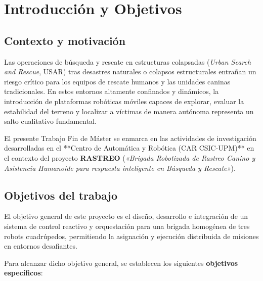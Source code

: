 \chapter{Introducción y Objetivos}
\label{chap:introduccion}

\section{Contexto y motivación}
\label{sec:contexto}

Las operaciones de búsqueda y rescate en estructuras colapsadas (\textit{Urban Search and Rescue}, USAR) tras desastres naturales o colapsos estructurales entrañan un riesgo crítico para los equipos de rescate humanos y las unidades caninas tradicionales. En estos entornos altamente confinados y dinámicos, la introducción de plataformas robóticas móviles capaces de explorar, evaluar la estabilidad del terreno y localizar a víctimas de manera autónoma representa un salto cualitativo fundamental.

El presente Trabajo Fin de Máster se enmarca en las actividades de investigación desarrolladas en el **Centro de Automática y Robótica (CAR CSIC-UPM)** en el contexto del proyecto \textbf{RASTREO} (\textit{«Brigada Robotizada de Rastreo Canino y Asistencia Humanoide para respuesta inteligente en Búsqueda y Rescate»}).

\section{Objetivos del trabajo}
\label{sec:objetivos}

El objetivo general de este proyecto es el diseño, desarrollo e integración de un sistema de control reactivo y orquestación para una brigada homogénea de tres robots cuadrúpedos, permitiendo la asignación y ejecución distribuida de misiones en entornos desafiantes.

Para alcanzar dicho objetivo general, se establecen los siguientes \textbf{objetivos específicos}:

